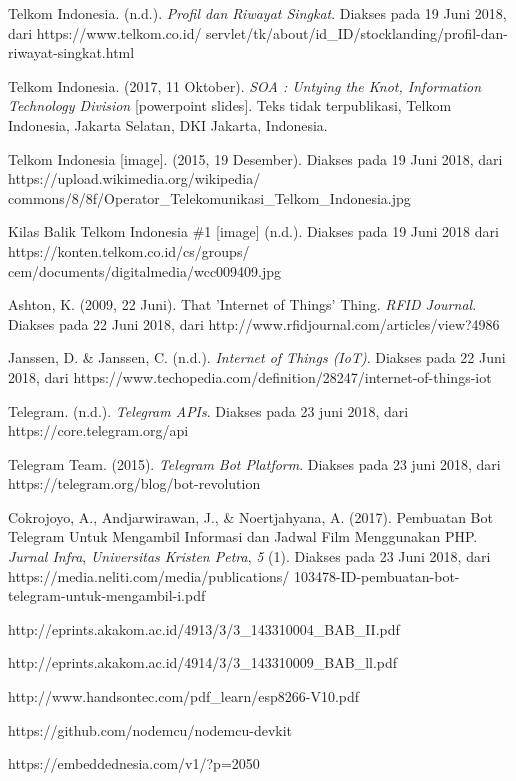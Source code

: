 \begin{thebibliography}{9}
	
	Telkom Indonesia. (n.d.). \textit{Profil dan Riwayat Singkat}. Diakses pada 19 Juni 2018, dari  https://www.telkom.co.id/ servlet/tk/about/id\_ID/stocklanding/profil-dan-riwayat-singkat.html
	
	Telkom Indonesia. (2017, 11 Oktober). \textit{SOA : Untying the Knot, Information Technology Division} [powerpoint slides]. Teks tidak terpublikasi, Telkom Indonesia, Jakarta Selatan, DKI Jakarta, Indonesia. 
	
	Telkom Indonesia [image]. (2015, 19 Desember). Diakses pada 19 Juni 2018, dari https://upload.wikimedia.org/wikipedia/ commons/8/8f/Operator\_Telekomunikasi\_Telkom\_Indonesia.jpg
	
	Kilas Balik Telkom Indonesia \#1 [image] (n.d.). Diakses pada 19 Juni 2018 dari https://konten.telkom.co.id/cs/groups/ cem/documents/digitalmedia/wcc009409.jpg
	
	Ashton, K. (2009, 22 Juni). That 'Internet of Things' Thing. \textit{RFID Journal}. Diakses pada 22 Juni 2018, dari http://www.rfidjournal.com/articles/view?4986
	
	Janssen, D. \& Janssen, C. (n.d.). \textit{Internet of Things (IoT)}. Diakses pada 22 Juni 2018, dari https://www.techopedia.com/definition/28247/internet-of-things-iot
	
	Telegram. (n.d.). \textit{Telegram APIs}. Diakses pada 23 juni 2018, dari https://core.telegram.org/api
	
	Telegram Team. (2015). \textit{Telegram Bot Platform}. Diakses pada 23 juni 2018, dari https://telegram.org/blog/bot-revolution
	
	\bibitem{}
	Cokrojoyo, A., Andjarwirawan, J., \&  Noertjahyana, A. (2017). Pembuatan Bot Telegram Untuk Mengambil Informasi dan Jadwal Film Menggunakan PHP. \textit{Jurnal Infra}, \textit{Universitas Kristen Petra}, \textit{5} (1). Diakses pada 23 Juni 2018, dari https://media.neliti.com/media/publications/ 103478-ID-pembuatan-bot-telegram-untuk-mengambil-i.pdf
	
	http://eprints.akakom.ac.id/4913/3/3\_143310004\_BAB\_II.pdf
	
	http://eprints.akakom.ac.id/4914/3/3\_143310009\_BAB\_ll.pdf 
	
	http://www.handsontec.com/pdf\_learn/esp8266-V10.pdf
	
	https://github.com/nodemcu/nodemcu-devkit
	
	https://embeddednesia.com/v1/?p=2050
\end{thebibliography}
